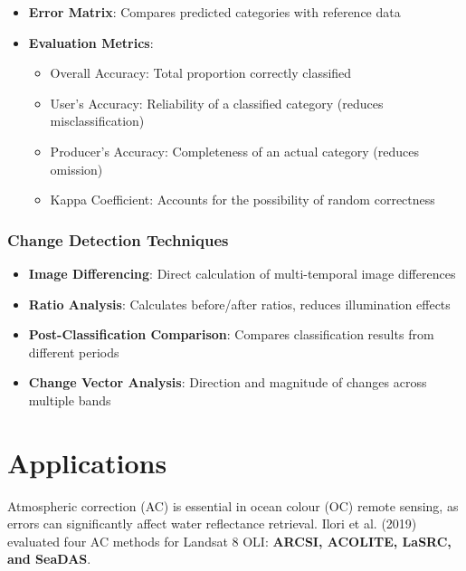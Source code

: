 \documentclass[
  letterpaper,
]{scrbook}
\providecommand{\tightlist}{%
  \setlength{\itemsep}{0pt}\setlength{\parskip}{0pt}}\usepackage{longtable,booktabs,array}
\begin{document}
\begin{itemize}
\tightlist
\item
  \textbf{Error Matrix}: Compares predicted categories with reference
  data
\item
  \textbf{Evaluation Metrics}:

  \begin{itemize}
  \tightlist
  \item
    Overall Accuracy: Total proportion correctly classified
  \item
    User's Accuracy: Reliability of a classified category (reduces
    misclassification)
  \item
    Producer's Accuracy: Completeness of an actual category (reduces
    omission)
  \item
    Kappa Coefficient: Accounts for the possibility of random
    correctness
  \end{itemize}
\end{itemize}

\subsection{Change Detection
Techniques}\label{change-detection-techniques}

\begin{itemize}
\tightlist
\item
  \textbf{Image Differencing}: Direct calculation of multi-temporal
  image differences
\item
  \textbf{Ratio Analysis}: Calculates before/after ratios, reduces
  illumination effects
\item
  \textbf{Post-Classification Comparison}: Compares classification
  results from different periods
\item
  \textbf{Change Vector Analysis}: Direction and magnitude of changes
  across multiple bands
\end{itemize}


\chapter{Applications}\label{applications-1}

Atmospheric correction (AC) is essential in ocean colour (OC) remote
sensing, as errors can significantly affect water reflectance retrieval.
Ilori et al. (2019) evaluated four AC methods for Landsat 8 OLI:
\textbf{ARCSI, ACOLITE, LaSRC, and SeaDAS}.
\end{document}
